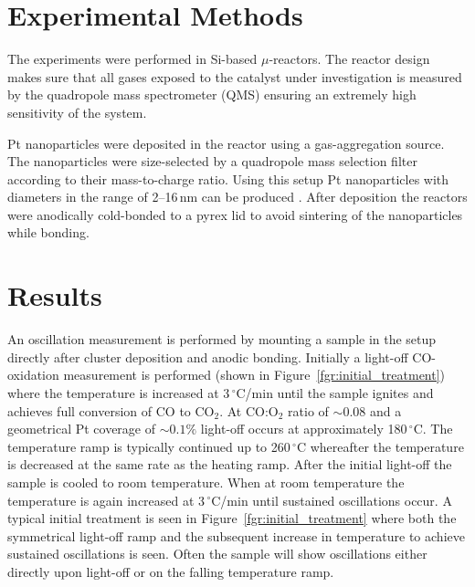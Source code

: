 \documentclass[8.5pt,twoside,twocolumn]{article}
\begin{document}
\section{Experimental Methods}
The experiments were performed in Si-based $\mu$-reactors\cite{Henriksen2009}.
The reactor design makes sure that all gases exposed to the catalyst under
investigation is measured by the quadropole mass spectrometer (QMS) ensuring an
extremely high sensitivity of the system.

Pt nanoparticles were deposited in the reactor using a gas-aggregation source.
The nanoparticles were size-selected by a quadropole mass selection filter
according to their mass-to-charge ratio. Using this setup Pt nanoparticles with
diameters in the range of 2--16\,nm can be produced \cite{Nielsen2009}. After
deposition the reactors were anodically cold-bonded \cite{Vesborg2010} to a
pyrex lid to avoid sintering of the nanoparticles while bonding.

\section{Results}
An oscillation measurement is performed by mounting a sample in the setup
directly after cluster deposition and anodic bonding. Initially a light-off CO-
oxidation measurement is performed (shown in
Figure~\ref{fgr:initial_treatment}) where the temperature is increased at
3\,$^\circ$C/min until the sample ignites and achieves full conversion of CO to
CO$_2$. At CO:O$_2$ ratio of $\sim0.08$ and a geometrical Pt coverage of
$\sim0.1\%$ light-off occurs at approximately 180\,$^\circ$C. The temperature
ramp is typically continued up to 260\,$^\circ$C whereafter the temperature is
decreased at the same rate as the heating ramp. After the initial light-off the
sample is cooled to room temperature. When at room temperature the temperature
is again increased at 3\,$^\circ$C/min until sustained oscillations occur. A
typical initial treatment is seen in Figure~\ref{fgr:initial_treatment} where
both the symmetrical light-off ramp and the subsequent increase in temperature
to achieve sustained oscillations is seen. Often the sample will show
oscillations either directly upon light-off or on the falling temperature ramp.
\end{document}
